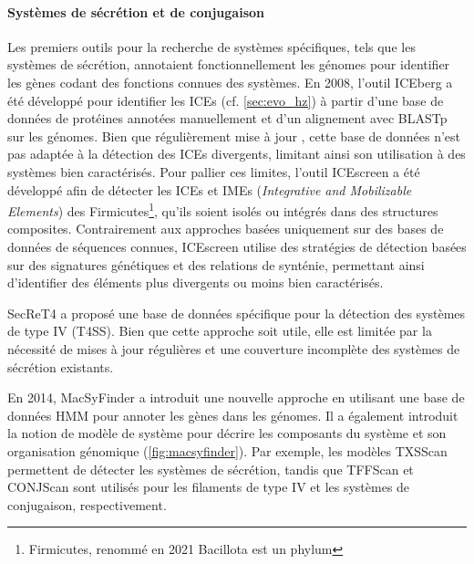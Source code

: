 \paragraph{Systèmes de sécrétion et de conjugaison}

Les premiers outils pour la recherche de systèmes spécifiques, tels que les systèmes de sécrétion, annotaient fonctionnellement les génomes pour identifier les gènes codant des fonctions connues des systèmes. En 2008, l'outil ICEberg \cite{bi_iceberg_2012} a été développé pour identifier les ICEs (cf. \autoref{sec:evo_hz}) à partir d'une base de données de protéines annotées manuellement et d'un alignement avec BLASTp sur les génomes. Bien que régulièrement mise à jour \cite{wang_iceberg_2024}, cette base de données n'est pas adaptée à la détection des ICEs divergents, limitant ainsi son utilisation à des systèmes bien caractérisés. Pour pallier ces limites, l’outil ICEscreen \cite{lao_icescreen_2022} a été développé afin de détecter les ICEs et IMEs (\textit{Integrative and Mobilizable Elements}) des Firmicutes\footnote{Firmicutes, renommé en 2021 Bacillota est un phylum  }, qu'ils soient isolés ou intégrés dans des structures composites. Contrairement aux approches basées uniquement sur des bases de données de séquences connues, ICEscreen utilise des stratégies de détection basées sur des signatures génétiques et des relations de synténie, permettant ainsi d’identifier des éléments plus divergents ou moins bien caractérisés.

SecReT4 \cite{bi_secret4_2013} a proposé une base de données spécifique pour la détection des systèmes de type IV (T4SS). Bien que cette approche soit utile, elle est limitée par la nécessité de mises à jour régulières et une couverture incomplète des systèmes de sécrétion existants.

En 2014, MacSyFinder \cite{abby_macsyfinder_2014} a introduit une nouvelle approche en utilisant une base de données HMM pour annoter les gènes dans les génomes. Il a également introduit la notion de modèle de système pour décrire les composants du système et son organisation génomique (\autoref{fig:macsyfinder}). Par exemple, les modèles TXSScan \cite{abby_identification_2016} permettent de détecter les systèmes de sécrétion, tandis que TFFScan \cite{denise_diversification_2019} et CONJScan \cite{cury_integrative_2017} sont utilisés pour les filaments de type IV et les systèmes de conjugaison, respectivement.

